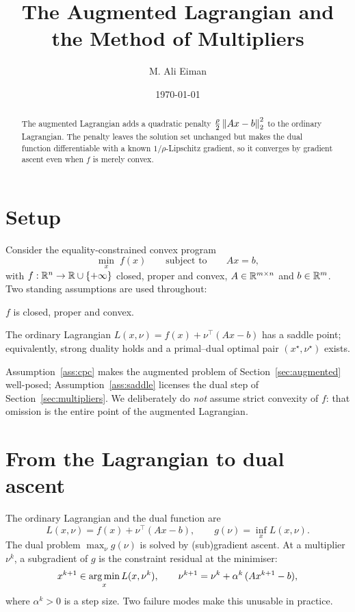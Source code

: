 \documentclass[11pt]{article}
\title{The Augmented Lagrangian and the Method of Multipliers}
\author{M. Ali Eiman}
\date{\today}
\begin{document}
\maketitle

\begin{abstract}
The augmented Lagrangian adds a quadratic penalty $\tfrac{\rho}{2}\left\lVert Ax-b \right\rVert_2^2$ to the
ordinary Lagrangian. The penalty leaves the solution set unchanged but makes the dual
function differentiable with a known $1/\rho$-Lipschitz gradient, so it converges by
gradient ascent even when $f$ is merely convex.
\end{abstract}

\section{Setup}
\label{sec:setup}

Consider the equality-constrained convex program
\begin{equation}
\min_x \; f(x) \qquad\text{subject to}\qquad Ax = b,
\label{eq:problem}
\end{equation}
with $f : \mathbb{R}^n \to \mathbb{R} \cup \{+\infty\}$ closed, proper and convex, $A \in \mathbb{R}^{m\times n}$
and $b \in \mathbb{R}^m$. Two standing assumptions are used throughout:

\begin{assumption}
\label{ass:cpc}
$f$ is closed, proper and convex.
\end{assumption}

\begin{assumption}
\label{ass:saddle}
The ordinary Lagrangian $L(x,\nu) = f(x) + \nu^\top(Ax-b)$ has a saddle point;
equivalently, strong duality holds and a primal--dual optimal pair $(x^\star,\nu^\star)$
exists.
\end{assumption}

Assumption~\ref{ass:cpc} makes the augmented problem of Section~\ref{sec:augmented}
well-posed; Assumption~\ref{ass:saddle} licenses the dual step of
Section~\ref{sec:multipliers}. We deliberately do \emph{not} assume strict convexity of
$f$: that omission is the entire point of the augmented Lagrangian.

\section{From the Lagrangian to dual ascent}
\label{sec:dualascent}

The ordinary Lagrangian and the dual function are
\begin{equation}
L(x,\nu) = f(x) + \nu^\top(Ax-b),
\qquad
g(\nu) = \inf_x L(x,\nu).
\end{equation}
The dual problem $\max_\nu g(\nu)$ is solved by (sub)gradient ascent. At a multiplier
$\nu^k$, a subgradient of $g$ is the constraint residual at the minimiser:
\begin{equation}
x^{k+1} \in \operatorname*{arg\,min}_x L(x, \nu^k),
\qquad
\nu^{k+1} = \nu^k + \alpha^k\,(A x^{k+1} - b),
\label{eq:dualascent}
\end{equation}
where $\alpha^k > 0$ is a step size. Two failure modes make this unusable in practice.
\end{document}
